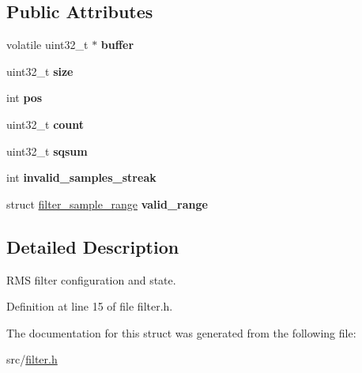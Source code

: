 \subsection*{Public Attributes}
\begin{DoxyCompactItemize}
\item 
\hypertarget{structfilter__rms_a54520c4d0cb0f9441f4c57eacf5bfd78}{}volatile uint32\+\_\+t $\ast$ {\bfseries buffer}\label{structfilter__rms_a54520c4d0cb0f9441f4c57eacf5bfd78}

\item 
\hypertarget{structfilter__rms_a8581be35641ea200e6bf23ce48f76196}{}uint32\+\_\+t {\bfseries size}\label{structfilter__rms_a8581be35641ea200e6bf23ce48f76196}

\item 
\hypertarget{structfilter__rms_a85d467406ed373c2ad1a134860fd24bd}{}int {\bfseries pos}\label{structfilter__rms_a85d467406ed373c2ad1a134860fd24bd}

\item 
\hypertarget{structfilter__rms_a42976cc476c577216f312bcd496eb79b}{}uint32\+\_\+t {\bfseries count}\label{structfilter__rms_a42976cc476c577216f312bcd496eb79b}

\item 
\hypertarget{structfilter__rms_a902e6aa671bf468ba0506ef5848f51cf}{}uint32\+\_\+t {\bfseries sqsum}\label{structfilter__rms_a902e6aa671bf468ba0506ef5848f51cf}

\item 
\hypertarget{structfilter__rms_a00a96dc7cf61e9c2643fdefc3d558ff2}{}int {\bfseries invalid\+\_\+samples\+\_\+streak}\label{structfilter__rms_a00a96dc7cf61e9c2643fdefc3d558ff2}

\item 
\hypertarget{structfilter__rms_abcd2a21aa49c2abb148493265da1efa5}{}struct \hyperlink{structfilter__sample__range}{filter\+\_\+sample\+\_\+range} {\bfseries valid\+\_\+range}\label{structfilter__rms_abcd2a21aa49c2abb148493265da1efa5}

\end{DoxyCompactItemize}


\subsection{Detailed Description}
R\+M\+S filter configuration and state. 

Definition at line 15 of file filter.\+h.



The documentation for this struct was generated from the following file\+:\begin{DoxyCompactItemize}
\item 
src/\hyperlink{filter_8h}{filter.\+h}\end{DoxyCompactItemize}
